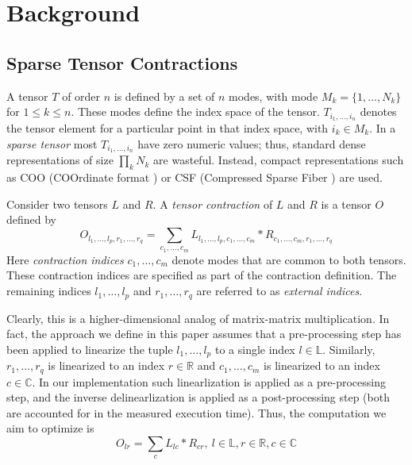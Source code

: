 \section{Background}
\label{sec:background}
\subsection{Sparse Tensor Contractions}
A tensor $T$ of order $n$ is defined by a set of $n$ modes, with mode $M_k = \{ 1, \ldots, N_k\}$ for $1 \le k \le n$. These modes define the index space of the tensor. $T_{i_1,\ldots,i_n}$ denotes the tensor element for a particular point in that index space, with $i_k\in M_k$. 
In a \emph{sparse tensor} most $T_{i_1,\ldots,i_n}$ have zero numeric values; thus, standard dense representations of size $\prod_k N_k$ are wasteful. Instead, compact representations such as COO (COOrdinate format \cite{tewarson1973sparse,frostt_page}) or CSF (Compressed Sparse Fiber \cite{smith-csf}) are used. 

Consider two tensors $L$ and $R$. A \emph{tensor contraction} of $L$ and $R$ is a tensor $O$ defined by
$$O_{l_1,\ldots,l_p,r_1,\ldots,r_q} = \sum_{c_1,\ldots,c_m} L_{l_1,\ldots,l_p,c_1,\ldots,c_m} \ast R_{c_1,\ldots,c_m, r_1,\ldots,r_q}$$
Here \emph{contraction indices} $c_1,\ldots,c_m$ denote modes that are common to both tensors. These contraction indices are specified as part of the contraction definition. The remaining indices $l_1,\ldots,l_p$ and $r_1,\ldots,r_q$ are referred to as \emph{external indices}.

Clearly, this is a higher-dimensional analog of matrix-matrix multiplication. In fact, the approach we define in this paper assumes that a pre-processing step has been applied to linearize the tuple $l_1,\ldots,l_p$ to a single index $l\in \mathbb{L}$. Similarly, $r_1,\ldots,r_q$ is linearized to an index $r\in \mathbb{R}$ and $c_1,\ldots,c_m$ is linearized to an index $c\in \mathbb{C}$. In our implementation such linearlization is applied as a pre-processing step, and the inverse delinearlization is applied as a post-processing step (both are accounted for in the measured execution time). Thus, the computation we aim to optimize is 
$$O_{lr} = \sum_c L_{lc} \ast R_{cr}, \ l \in \mathbb{L}, r \in \mathbb{R}, c\in \mathbb{C}$$

